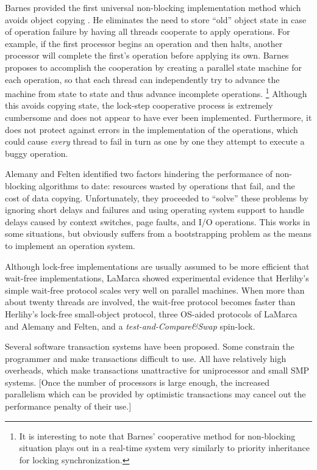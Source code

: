 \documentclass[preprint]{rdbacmconf}
\begin{document}
Barnes provided the first universal non-blocking implementation
method which avoids object copying \cite{Barnes93}.  He eliminates the
need to store ``old'' object
state in case of operation failure by having all threads cooperate to
apply operations.  For example, if the first processor begins an operation
and then halts, another processor will complete the first's operation
before applying its own.  Barnes proposes to accomplish the
cooperation by creating a parallel state machine for each operation,
so that each thread can independently try to advance the machine from state
to state and thus advance incomplete operations.%
\footnote{It is interesting to note that Barnes' cooperative method
  for non-blocking 
  situation plays out in a real-time system very similarly to priority
  inheritance for locking synchronization.}
Although this avoids
copying state, the lock-step cooperative process is extremely
cumbersome and does not appear to have ever been implemented.
Furthermore, it does not protect against errors in the implementation
of the operations, which could cause \emph{every} thread to fail in turn
as one by one they attempt to execute a buggy operation.

Alemany and Felten \cite{AlemanyFe92} identified two factors hindering the
performance of non-blocking algorithms to date: resources wasted by operations
that fail, and the cost of data copying.  Unfortunately, they
proceeded to
``solve'' these problems by ignoring short delays and failures and
using operating system support to handle delays caused by
context switches, page faults, and
I/O operations.  This works in some situations, but obviously suffers
from a bootstrapping problem as the means to implement an operation system.

Although lock-free implementations are usually assumed to be more
efficient that wait-free implementations, LaMarca \cite{LaMarca94}
showed experimental evidence that Herlihy's simple
wait-free protocol scales very well on parallel machines.
When more than about twenty threads are involved, the wait-free
protocol becomes
faster than Herlihy's lock-free small-object protocol, three OS-aided
protocols of LaMarca and Alemany and Felten, and a
\emph{test-and-Compare\&Swap} spin-lock.



Several software transaction systems have been proposed.  Some constrain the
programmer and make transactions difficult to use.  All have
relatively high overheads, which make transactions unattractive for
uniprocessor and small SMP systems. [Once the number of processors is
large enough, the increased parallelism which can be provided by
optimistic transactions may cancel out the performance penalty of
their use.]
\end{document}
